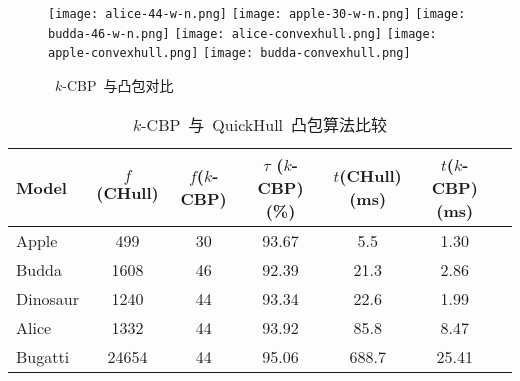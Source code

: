 \begin{figure}[H] 
\centering
{}
{  
   \texttt{[image: alice-44-w-n.png]}
}
{
    \texttt{[image: apple-30-w-n.png]}
}
{  
}
{  
   \texttt{[image: budda-46-w-n.png]}
}
\linebreak
{}
{  
   \texttt{[image: alice-convexhull.png]}
}
{
    \texttt{[image: apple-convexhull.png]}
}
{  
}
{  
   \texttt{[image: budda-convexhull.png]}
}
\linebreak
{}
{
}
{  
}
\caption{~$k$-CBP~与凸包对比}
\label{pic:exps:ch-kcbp}
\end{figure}

\begin{table}[H] 
\centering
\caption{$k$-CBP~与~QuickHull~凸包算法比较}
\label{tab:exp:cgal}
\begin{tabular}{lcccccl}
\toprule[1.5pt]
 Model & $f$(CHull)& $f$($k$-CBP) & $\tau$ ($k$-CBP)(\%) & $t$(CHull)(ms) & $t$($k$-CBP)(ms)\\ %
\midrule[1.0pt]
  Apple	& 499 & 30 & 93.67 & 5.5 & 1.30 \\ %
  Budda	& 1608 & 46 & 92.39 & 21.3 & 2.86 \\ %
  Dinosaur	& 1240 & 44 & 93.34 & 22.6 & 1.99 \\  %
  Alice	& 1332 & 44 & 93.92 & 85.8 & 8.47\\ %
  Bugatti & 24654 & 44 & 95.06 & 688.7 & 25.41 \\
\bottomrule[1.5pt]
\end{tabular}
\end{table}


